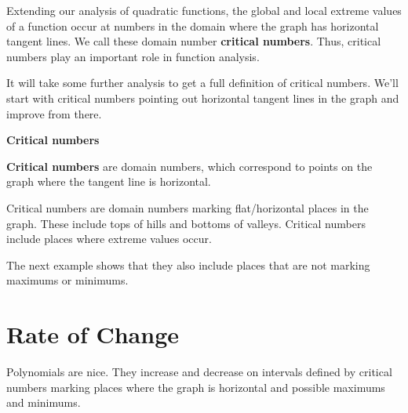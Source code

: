 \documentclass{ximera}
\begin{document}
Extending our analysis of quadratic functions, the global and local extreme values of a function occur at numbers in the domain where the graph has horizontal tangent lines. We call these domain number \textbf{critical numbers}.  Thus, critical numbers play an important role in function analysis.  


It will take some further analysis to get a full definition of critical numbers. We'll start with critical numbers pointing out horizontal tangent lines in the graph and improve from there.









\begin{definition} \item \textbf{\textcolor{green!50!black}{Critical numbers}}

\textbf{Critical numbers} are domain numbers, which correspond to points on the graph where the tangent line is horizontal.

\end{definition}




Critical numbers are domain numbers marking flat/horizontal places in the graph.  These include tops of hills and bottoms of valleys. Critical numbers include places where extreme values occur.


The next example shows that they also include places that are not marking maximums or minimums.














\section{Rate of Change}



Polynomials are nice.  They increase and decrease on intervals defined by critical numbers marking places where the graph is horizontal and possible maximums and minimums.
\end{document}
